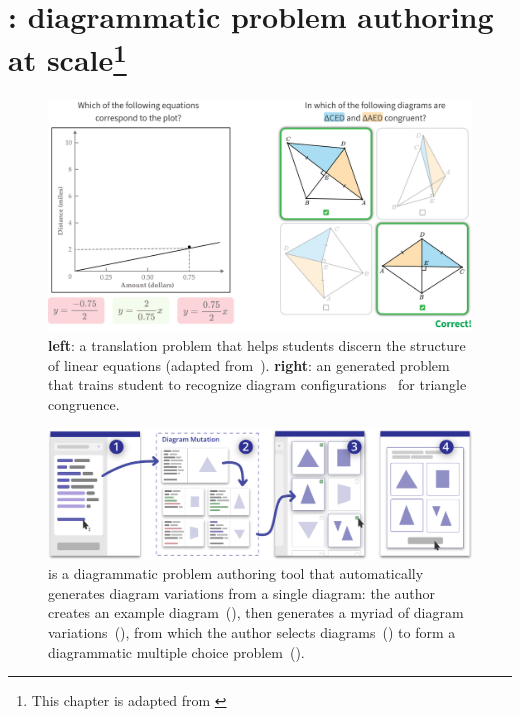 \chapter[\Edgeworth: diagrammatic problem authoring at scale]{\Edgeworth: diagrammatic problem authoring at scale\footnote{This chapter is adapted from \citet[Sections~1--5]{ni_edgeworth_2024}}}
\label{chp:edgeworth}

\begin{figure}[h]
    \centering
    \includegraphics[width=0.88\linewidth]{assets/chapter-3/translation-problem.pdf}
    \caption{\textbf{left}: a translation problem that helps students discern the structure of linear equations (adapted from~\cite{perceptualLearning}). \textbf{right}: an \Edgeworth generated problem that trains student to recognize diagram configurations~\cite{Koedinger1990a} for triangle congruence.}
    \label{fig:translation-problem}
\end{figure}

\vspace{10pt}

\begin{figure}
    \centering
    \includegraphics[width=\linewidth]{assets/chapter-3/edgeworth-teaser.pdf}
    \caption{\Edgeworth is a diagrammatic problem authoring tool that automatically generates diagram variations from a single diagram: \textmd{the author creates an example diagram~(), then \Edgeworth generates a myriad of diagram variations~(), from which the author selects diagrams~() to form a diagrammatic multiple choice problem~().}}
    \label{fig:teaser}
\end{figure}


